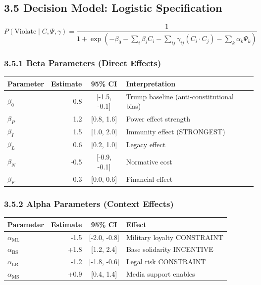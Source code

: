 \subsection{3.5 Decision Model: Logistic Specification}

\begin{equation}
P(\text{Violate} \mid C, \Psi, \gamma) = \frac{1}{1 + \exp\left(-\beta_0 - \sum_i \beta_i C_i - \sum_{ij} \gamma_{ij}(C_i \cdot C_j) - \sum_k \alpha_k \Psi_k\right)}
\end{equation}

\subsubsection{3.5.1 Beta Parameters (Direct Effects)}

\begin{table}[h]
\centering
\begin{tabular}{|l|r|c|l|}
\hline
\textbf{Parameter} & \textbf{Estimate} & \textbf{95\% CI} & \textbf{Interpretation} \\
\hline
$\beta_0$ & -0.8 & [-1.5, -0.1] & Trump baseline (anti-constitutional bias) \\
$\beta_P$ & 1.2 & [0.8, 1.6] & Power effect strength \\
$\beta_I$ & 1.5 & [1.0, 2.0] & Immunity effect (STRONGEST) \\
$\beta_L$ & 0.6 & [0.2, 1.0] & Legacy effect \\
$\beta_N$ & -0.5 & [-0.9, -0.1] & Normative cost \\
$\beta_F$ & 0.3 & [0.0, 0.6] & Financial effect \\
\hline
\end{tabular}
\end{table}

\subsubsection{3.5.2 Alpha Parameters (Context Effects)}

\begin{table}[h]
\centering
\begin{tabular}{|l|r|c|l|}
\hline
\textbf{Parameter} & \textbf{Estimate} & \textbf{95\% CI} & \textbf{Effect} \\
\hline
$\alpha_{\text{ML}}$ & -1.5 & [-2.0, -0.8] & Military loyalty CONSTRAINT \\
$\alpha_{\text{BS}}$ & +1.8 & [1.2, 2.4] & Base solidarity INCENTIVE \\
$\alpha_{\text{LR}}$ & -1.2 & [-1.8, -0.6] & Legal risk CONSTRAINT \\
$\alpha_{\text{MS}}$ & +0.9 & [0.4, 1.4] & Media support enables \\
\hline
\end{tabular}
\end{table}

